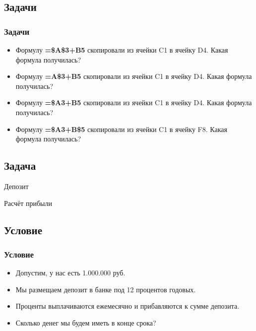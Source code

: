 \documentclass[compress,red]{beamer}
\begin{document}
\subsection{Задачи}
\begin{frame}[fragile]
  \frametitle{Задачи}
  \begin{itemize}[<+->]
    \item Формулу \textbf{=\$A\$3+B5} скопировали из ячейки C1 в ячейку D4. Какая формула получилась?
    \item Формулу \textbf{=A\$3+B5} скопировали из ячейки C1 в ячейку D4. Какая формула получилась?
    \item Формулу \textbf{=\$A3+B5} скопировали из ячейки C1 в ячейку D4. Какая формула получилась?
    \item Формулу \textbf{=\$A3+B\$5} скопировали из ячейки C1 в ячейку F8. Какая формула получилась?
  \end{itemize}
\end{frame}

\subsection{Задача}
\begin{frame}
  \begin{center}
    \Huge{Депозит}
  \end{center}
  \begin{center}
    \Large{Расчёт прибыли}
  \end{center}
\end{frame}

\subsection{Условие}
\begin{frame}[fragile]
  \frametitle{Условие}
  \begin{itemize}
    \item Допустим, у нас есть 1.000.000 руб.
    \item Мы размещаем депозит в банке под 12 процентов годовых.
    \item Проценты выплачиваются ежемесячно и прибавляются к сумме депозита.
    \item Сколько денег мы будем иметь в конце срока?
  \end{itemize}
\end{frame}
\end{document}
